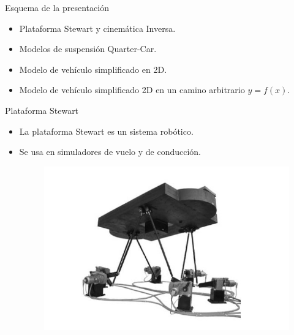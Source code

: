 \documentclass{beamer}
\begin{document}
\begin{frame}{Esquema de la presentación}

\begin{itemize}
 \item Plataforma Stewart y cinemática Inversa.
 \item Modelos de suspensión Quarter-Car.
 \item Modelo de vehículo simplificado en 2D. 
 \item Modelo de vehículo simplificado 2D en un camino arbitrario $y=f(x)$.
\end{itemize}
\vskip 1cm
\end{frame}
\begin{frame}{Plataforma Stewart}

\begin{itemize}
 \item La plataforma Stewart es un sistema robótico.
 \item Se usa en simuladores de vuelo  y de conducción.
 
\begin{figure}[h]
\centering
\includegraphics[scale=0.4]{stewart}

\end{figure}
 
\end{itemize}
\vskip 1cm
\end{frame}
\end{document}

